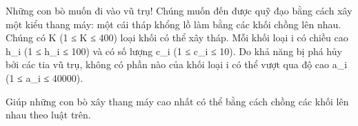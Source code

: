Những con bò muốn đi vào vũ trụ! Chúng muốn đến được quỹ đạo bằng cách xây một kiểu thang máy: một cái tháp khổng lồ làm bằng các khối chồng lên nhau. Chúng có K (1 ≤ K ≤ 400) loại khối có thể xây tháp. Mỗi khối loại i có chiều cao h\_i (1 ≤ h\_i ≤ 100) và có số lượng c\_i (1 ≤ c\_i ≤ 10). Do khả năng bị phá hủy bởi các tia vũ trụ, không có phần nào của khối loại i có thể vượt qua độ cao a\_i (1 ≤ a\_i ≤ 40000).

Giúp những con bò xây thang máy cao nhất có thể bằng cách chồng các khối lên nhau theo luật trên.
